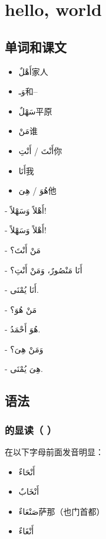\chapter{hello, world}

\section{单词和课文}

\begin{itemize}
    \item \ac{أَهْلٌ}{家人}
    \item \ac{وَـ}{和--}
    \item \ac{سَهْلٌ}{平原}
    \item \ac{مَنْ}{谁}
    \item \ac{أَنْتَ / أَنْتِ}{你}
    \item \ac{أَنَا}{我}
    \item \ac{هُوَ / هِىَ}{他}
\end{itemize}

\begin{Arabic}
    - أَهْلاً وَسَهْلاً!

    - أَهْلاً وَسَهْلاً!

    - مَنْ أَنْتَ؟

    - أَنَا مَنْصُورٌ، وَمَنْ أَنْتِ؟

    - أَنَا يُمْنَى.

    - مَنْ هُوَ؟

    - هُوَ أَحْمَدُ.

    - وَمَنْ هِىَ؟

    - هِىَ يُمْنَى.
\end{Arabic}

\section{语法}

\subsection{  的显读（ ）}

 在以下字母前面发音明显：

\begin{itemize}
    \item \ac{أَنْحَاءٌ}{}
    \item \ac{أَنْخَابٌ}{}
    \item \ac{صَنْعَاءٌ}{萨那（也门首都）}
    \item \ac{أَنْغَاءٌ}{}
\end{itemize}

